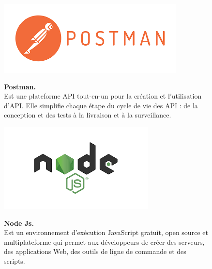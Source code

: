 \begin{figure}[H]
    \centering
    \begin{minipage}[c]{0.3\textwidth}
        \includegraphics[width=\linewidth]{projet/images/diagramme de sequance/images/PostMan.png}
    \end{minipage}
    \hspace{1cm}
    \begin{minipage}[c]{0.6\textwidth}
        \textbf{Postman.}\\[0.5em]
        Est une plateforme API tout-en-un pour la création et l'utilisation d'API. Elle simplifie chaque étape du cycle de vie des API : de la conception et des tests à la livraison et à la surveillance. \cite{ref5}
    \end{minipage}
\end{figure}

\vspace{0.5cm}

\begin{figure}[H]
    \centering
    \begin{minipage}[c]{0.3\textwidth}
        \includegraphics[width=\linewidth]{projet/images/diagramme de sequance/images/Node JS.png}
    \end{minipage}
    \hspace{1cm}
    \begin{minipage}[c]{0.6\textwidth}
        \textbf{Node Js.}\\[0.5em]
        Est un environnement d'exécution JavaScript gratuit, open source et multiplateforme qui permet aux développeurs de créer des serveurs, des applications Web, des outils de ligne de commande et des scripts. \cite{ref6}
    \end{minipage}
\end{figure}

